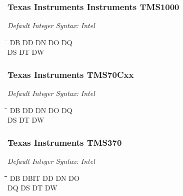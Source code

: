 \subsubsection{Texas Instruments Instruments TMS1000}

{\em Default Integer Syntax: Intel}

{\tt\begin{tabbing}
\hspace{3cm}\=\hspace{3cm}\=\hspace{3cm}\=\hspace{3cm}\=\kill
DB         \> DD          \> DN          \> DO         \> DQ \\
DS         \> DT          \> DW \\
\end{tabbing}}

\subsubsection{Texas Instruments TMS70Cxx}

{\em Default Integer Syntax: Intel}

{\tt\begin{tabbing}
\hspace{3cm}\=\hspace{3cm}\=\hspace{3cm}\=\hspace{3cm}\=\kill
DB         \> DD          \> DN          \> DO         \> DQ \\
DS         \> DT          \> DW \\
\end{tabbing}}

\subsubsection{Texas Instruments TMS370}

{\em Default Integer Syntax: Intel}

{\tt\begin{tabbing}
\hspace{3cm}\=\hspace{3cm}\=\hspace{3cm}\=\hspace{3cm}\=\kill
DB         \> DBIT        \> DD          \> DN          \> DO \\
DQ         \> DS          \> DT          \> DW \\
\end{tabbing}}

